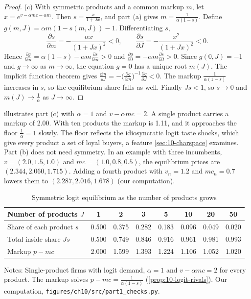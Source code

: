 \begin{proof}
(c) With symmetric products and a common markup $m$, let $x = e^{v - \alpha mc - \alpha m}$. Then
$s = \frac{x}{1 + Jx}$, and part (a) gives $m = \frac{1}{\alpha(1 - s)}$. Define
$g(m,J) = \alpha m(1 - s(m,J)) - 1$. Differentiating $s$,
\begin{equation*}
  \frac{\partial s}{\partial m} = -\frac{\alpha x}{(1 + Jx)^2} < 0, \qquad
  \frac{\partial s}{\partial J} = -\frac{x^2}{(1 + Jx)^2} < 0 .
\end{equation*}
Hence $\frac{\partial g}{\partial m} = \alpha(1 - s) - \alpha m\frac{\partial s}{\partial m} > 0$ and
$\frac{\partial g}{\partial J} = -\alpha m\frac{\partial s}{\partial J} > 0$. Since $g(0,J) = -1$ and
$g \to \infty$ as $m \to \infty$, the equation $g = 0$ has a unique root $m(J)$. The implicit function
theorem gives $\frac{\dd m}{\dd J} = -\bigl(\frac{\partial g}{\partial m}\bigr)^{-1}\frac{\partial g}{\partial J} < 0$. The markup
$\frac{1}{\alpha(1-s)}$ increases in $s$, so the equilibrium share falls as well. Finally $Js < 1$, so $s \to
0$ and $m(J) \to \frac{1}{\alpha}$ as $J \to \infty$.
\end{proof}

 illustrates part (c) with $\alpha = 1$ and $v - \alpha mc = 2$. A single product
carries a markup of 2.00. With ten products the markup is 1.11, and it approaches the floor $\frac{1}{\alpha}
= 1$ slowly. The floor reflects the idiosyncratic logit taste shocks, which give every product a set of loyal
buyers, a feature \cref{sec:10-charspace} examines. Part (b) does not need symmetry. In an example with three
incumbents, $v = (2.0,1.5,1.0)$ and $mc = (1.0,0.8,0.5)$, the equilibrium prices are $(2.344,2.060,1.715)$.
Adding a fourth product with $v_n = 1.2$ and $mc_n = 0.7$ lowers them to $(2.287,2.016,1.678)$ (our
computation).

\begin{table}[htbp]
\centering
\caption{Symmetric logit equilibrium as the number of products grows}\label{tab:10-logit-entry}
\begin{threeparttable}
\begin{tabular}{@{}lccccccc@{}}
\toprule
Number of products $J$ & 1 & 2 & 3 & 5 & 10 & 20 & 50 \\
\midrule
Share of each product $s$ & 0.500 & 0.375 & 0.282 & 0.183 & 0.096 & 0.049 & 0.020 \\
Total inside share $Js$ & 0.500 & 0.749 & 0.846 & 0.916 & 0.961 & 0.981 & 0.993 \\
Markup $p - mc$ & 2.000 & 1.599 & 1.393 & 1.224 & 1.106 & 1.052 & 1.020 \\
\bottomrule
\end{tabular}
\begin{tablenotes}[flushleft]\footnotesize
\item Notes: Single-product firms with logit demand, $\alpha = 1$ and $v - \alpha mc = 2$ for every product. The
markup solves $p - mc = \frac{1}{\alpha(1 - s)}$ (\cref{prop:10-logit-rivals}). Our computation,
\texttt{figures/ch10/src/part1\_checks.py}.
\end{tablenotes}
\end{threeparttable}
\end{table}

